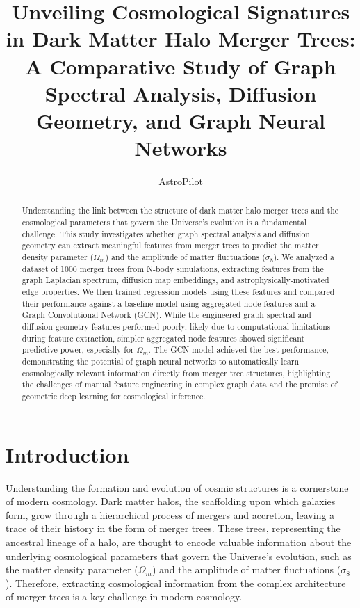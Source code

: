 \documentclass[twocolumn]{aastex631}
\begin{document}
\title{Unveiling Cosmological Signatures in Dark Matter Halo Merger Trees: A Comparative Study of Graph Spectral Analysis, Diffusion Geometry, and Graph Neural Networks}

\author{AstroPilot}

\begin{abstract}
Understanding the link between the structure of dark matter halo merger trees and the cosmological parameters that govern the Universe's evolution is a fundamental challenge. This study investigates whether graph spectral analysis and diffusion geometry can extract meaningful features from merger trees to predict the matter density parameter ($\Omega_m$) and the amplitude of matter fluctuations ($\sigma_8$). We analyzed a dataset of 1000 merger trees from N-body simulations, extracting features from the graph Laplacian spectrum, diffusion map embeddings, and astrophysically-motivated edge properties. We then trained regression models using these features and compared their performance against a baseline model using aggregated node features and a Graph Convolutional Network (GCN). While the engineered graph spectral and diffusion geometry features performed poorly, likely due to computational limitations during feature extraction, simpler aggregated node features showed significant predictive power, especially for $\Omega_m$. The GCN model achieved the best performance, demonstrating the potential of graph neural networks to automatically learn cosmologically relevant information directly from merger tree structures, highlighting the challenges of manual feature engineering in complex graph data and the promise of geometric deep learning for cosmological inference.
\
\end{abstract}



\section{Introduction}
\label{sec:intro}
Understanding the formation and evolution of cosmic structures is a cornerstone of modern cosmology. Dark matter halos, the scaffolding upon which galaxies form, grow through a hierarchical process of mergers and accretion, leaving a trace of their history in the form of merger trees. These trees, representing the ancestral lineage of a halo, are thought to encode valuable information about the underlying cosmological parameters that govern the Universe's evolution, such as the matter density parameter ($\Omega_m$) and the amplitude of matter fluctuations ($\sigma_8$). Therefore, extracting cosmological information from the complex architecture of merger trees is a key challenge in modern cosmology.
\end{document}
